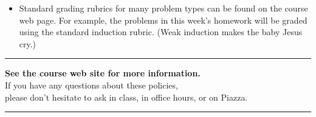 \documentclass[11pt]{article}
\begin{document}
\begin{itemize}
\item
Standard grading rubrics for many problem types can be found on the course web page.   For example, the problems in this week’s homework will be graded using the standard induction rubric.  (Weak induction makes the baby Jesus cry.)


\end{itemize}

\bigskip
\hrule
\smallskip

\begin{center}
\large \textbf{See the course web site for more information.}\\[1ex]\normalsize
If you have any questions about these policies,\\
please don’t hesitate to ask in class, in office hours, or on Piazza.
\end{center}

\hrule

\end{document}
